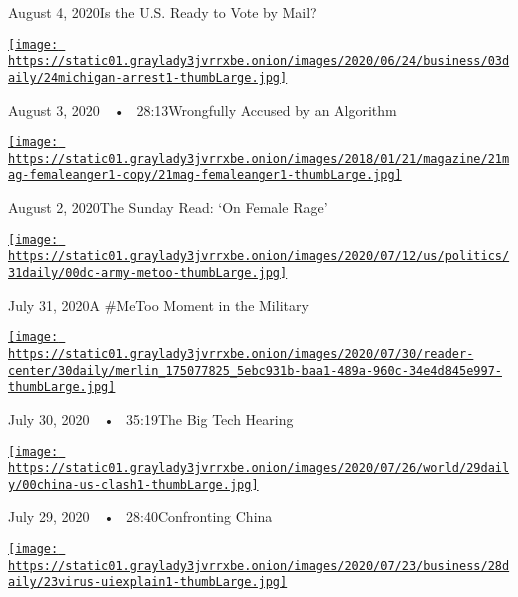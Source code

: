 August 4, 2020Is the U.S. Ready to Vote by Mail?

\href{https://www.nytimes3xbfgragh.onion/2020/08/03/podcasts/the-daily/algorithmic-justice-racism.html?action=click\&module=audio-series-bar\&region=header\&pgtype=Article}{\texttt{[image: https://static01.graylady3jvrrxbe.onion/images/2020/06/24/business/03daily/24michigan-arrest1-thumbLarge.jpg]}}

August 3, 2020~~•~ 28:13Wrongfully Accused by an Algorithm

\href{https://www.nytimes3xbfgragh.onion/2020/08/02/podcasts/the-daily/on-female-rage.html?action=click\&module=audio-series-bar\&region=header\&pgtype=Article}{\texttt{[image: https://static01.graylady3jvrrxbe.onion/images/2018/01/21/magazine/21mag-femaleanger1-copy/21mag-femaleanger1-thumbLarge.jpg]}}

August 2, 2020The Sunday Read: `On Female Rage'

\href{https://www.nytimes3xbfgragh.onion/2020/07/31/podcasts/the-daily/vanessa-guillen-military-metoo.html?action=click\&module=audio-series-bar\&region=header\&pgtype=Article}{\texttt{[image: https://static01.graylady3jvrrxbe.onion/images/2020/07/12/us/politics/31daily/00dc-army-metoo-thumbLarge.jpg]}}

July 31, 2020A \#MeToo Moment in the Military

\href{https://www.nytimes3xbfgragh.onion/2020/07/30/podcasts/the-daily/congress-facebook-amazon-google-apple.html?action=click\&module=audio-series-bar\&region=header\&pgtype=Article}{\texttt{[image: https://static01.graylady3jvrrxbe.onion/images/2020/07/30/reader-center/30daily/merlin\_175077825\_5ebc931b-baa1-489a-960c-34e4d845e997-thumbLarge.jpg]}}

July 30, 2020~~•~ 35:19The Big Tech Hearing

\href{https://www.nytimes3xbfgragh.onion/2020/07/29/podcasts/the-daily/china-trump-foreign-policy.html?action=click\&module=audio-series-bar\&region=header\&pgtype=Article}{\texttt{[image: https://static01.graylady3jvrrxbe.onion/images/2020/07/26/world/29daily/00china-us-clash1-thumbLarge.jpg]}}

July 29, 2020~~•~ 28:40Confronting China

\href{https://www.nytimes3xbfgragh.onion/2020/07/28/podcasts/the-daily/unemployment-benefits-coronavirus.html?action=click\&module=audio-series-bar\&region=header\&pgtype=Article}{\texttt{[image: https://static01.graylady3jvrrxbe.onion/images/2020/07/23/business/28daily/23virus-uiexplain1-thumbLarge.jpg]}}

